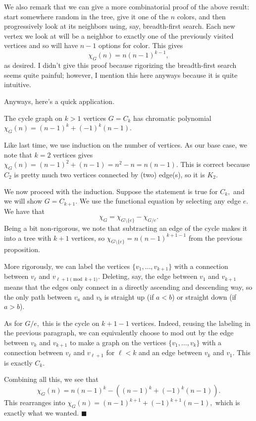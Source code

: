 We also remark that we can give a more combinatorial proof of the above result: start somewhere random in the tree, give it one of the $n$ colors, and then progressively look at its neighbors using, say, breadth-first search. Each new vertex we look at will be a neighbor to exactly one of the previously visited vertices and so will have $n-1$ options for color. This gives
\[\chi_G(n)=n(n-1)^{k-1},\]
as desired. I didn't give this proof because rigorizing the breadth-first search seems quite painful; however, I mention this here anyways because it is quite intuitive.

Anyways, here's a quick application.
\begin{proposition}
    The cycle graph on $k>1$ vertices $G=C_k$ has chromatic polynomial $\chi_G(n)=(n-1)^k+(-1)^k(n-1).$
\end{proposition}
Like last time, we use induction on the number of vertices. As our base case, we note that $k=2$ vertices gives $\chi_G(n)=(n-1)^2+(n-1)=n^2-n=n(n-1).$ This is correct because $C_2$ is pretty much two vertices connected by (two) edge(s), so it is $K_2.$

We now proceed with the induction. Suppose the statement is true for $C_k,$ and we will show $G=C_{k+1}.$ We use the functional equation by selecting any edge $e.$ We have that
\[\chi_G=\chi_{G\setminus\{e\}}-\chi_{G/e}.\]
Being a bit non-rigorous, we note that subtracting an edge of the cycle makes it into a tree with $k+1$ vertices, so $\chi_{G\setminus\{e\}}=n(n-1)^{k+1-1}$ from the previous proposition.

More rigorously, we can label the vertices $\{v_1,\ldots,v_{k+1}\}$ with a connection between $v_\ell$ and $v_{\ell+1\pmod{k+1}}.$ Deleting, say, the edge between $v_1$ and $v_{k+1}$ means that the edges only connect in a directly ascending and descending way, so the only path between $v_a$ and $v_b$ is straight up (if $a<b$) or straight down (if $a>b$).

As for $G/e,$ this is the cycle on $k+1-1$ vertices. Indeed, reusing the labeling in the previous paragraph, we can equivalently choose to mod out by the edge between $v_k$ and $v_{k+1}$ to make a graph on the vertices $\{v_1,\ldots,v_k\}$ with a connection between $v_\ell$ and $v_{\ell+1}$ for $\ell<k$ and an edge between $v_k$ and $v_1.$ This is exactly $C_k.$

Combining all this, we see that
\[\chi_G(n)=n(n-1)^k-\left((n-1)^k+(-1)^k(n-1)\right).\]
This rearranges into $\chi_G(n)=(n-1)^{k+1}+(-1)^{k+1}(n-1),$ which is exactly what we wanted. $\blacksquare$

